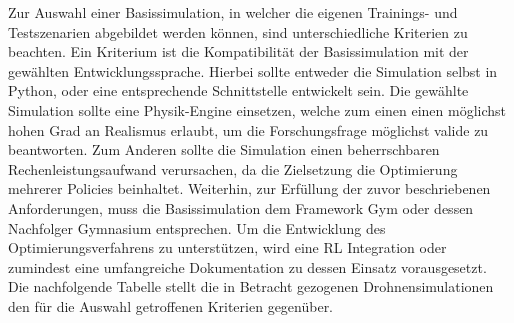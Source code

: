 Zur Auswahl einer Basissimulation, in welcher die eigenen Trainings- und Testszenarien abgebildet werden können, sind unterschiedliche Kriterien zu beachten.
Ein Kriterium ist die Kompatibilität der Basissimulation mit der gewählten Entwicklungssprache. 
Hierbei sollte entweder die Simulation selbst in Python, oder eine entsprechende Schnittstelle entwickelt sein.
Die gewählte Simulation sollte eine Physik-Engine einsetzen, welche zum einen einen möglichst hohen Grad an Realismus erlaubt, um die Forschungsfrage möglichst valide zu beantworten.
Zum Anderen sollte die Simulation einen beherrschbaren Rechenleistungsaufwand verursachen, da die Zielsetzung die Optimierung mehrerer Policies beinhaltet.
Weiterhin, zur Erfüllung der zuvor beschriebenen Anforderungen, muss die Basissimulation dem Framework Gym oder dessen Nachfolger Gymnasium entsprechen.
Um die Entwicklung des Optimierungsverfahrens zu unterstützen, wird eine RL Integration oder zumindest eine umfangreiche Dokumentation zu dessen Einsatz vorausgesetzt.
Die nachfolgende Tabelle stellt die in Betracht gezogenen Drohnensimulationen den für die Auswahl getroffenen Kriterien gegenüber.

